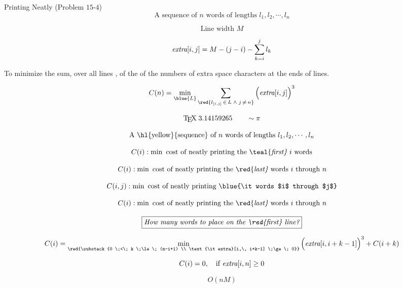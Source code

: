 
\begin{frame}{}
  \begin{exampleblock}{Printing Neatly (Problem $15$-$4$)}
    \[
      \text{A sequence of $n$ words of lengths } l_1, l_2, \cdots, l_n
    \]

    \[
      \text{Line width } M
    \]

    \[
      \text{\it extra}[i,j] = M - (j-i) - \sum_{k=i}^{j} l_k
    \]

    \pause
    \begin{center}
      To minimize the sum, over all lines , of the  of the numbers of
      extra space characters at the ends of lines.
    \end{center}

    \[
      C(n) = \min_{\blue{L}} \sum_{\red{l_{[i,j]} \,\in\, L \;\land\; j \,\neq\, n}} \Big(\text{\it extra}[i,j]\Big)^3
    \]
  \end{exampleblock}
\end{frame}

\begin{frame}{}

  \pause
  \[
    \text{\TeX } \; 3.14159265 \qquad \sim \pi
  \]
\end{frame}

\begin{frame}{}
  \[
    \text{A \hl{yellow}{sequence} of $n$ words of lengths } l_1, l_2, \cdots, l_n
  \]

  \pause
  \vspace{0.50cm}
  \[
    C(i): \min \text{ cost of neatly printing the \teal{\it first} $i$ words}
  \]

  \[
    C(i): \min \text{ cost of neatly printing the \red{\it last} words $i$ through $n$}
  \]

  \[
    C(i,j): \min \text{ cost of neatly printing \blue{\it words $i$ through $j$}}
  \]
\end{frame}

\begin{frame}{}
  \[
    C(i): \min \text{ cost of neatly printing the \red{\it last} words $i$ through $n$}
  \]

  \pause
  \[
    \fbox{\text{\it How many words to place on the \red{first} line?}}
  \]

  \pause
  \vspace{0.50cm}
  \[
    C(i) = \min_{\red{\substack{0 \;<\; k \;\le\; (n-i+1) \\ \text{\it extra}[i,\, i+k-1] \;\ge\; 0}}} \Big(\text{\it extra}[i, i+k-1]\Big)^3 + C(i+k)
  \]

  \pause
  \vspace{0.30cm}
  \[
    C(i) = 0, \quad \text{if {\it extra}}[i,n] \ge 0 
  \]

  \pause
  \[
    O(nM)
  \]
\end{frame}

